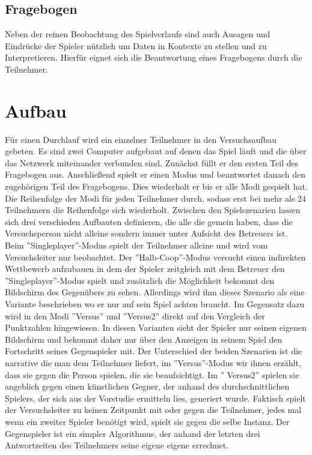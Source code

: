 \subsection{Fragebogen}
Neben der reinen Beobachtung des Spielverlaufs sind auch Ausagen und Eindrücke der Spieler nützlich um Daten in Kontexte zu stellen und zu Interpretieren. Hierfür eignet sich die Beantwortung eines Fragebogens durch die Teilnehmer.

\section{Aufbau}
Für einen Durchlauf wird ein einzelner Teilnehmer in den Versuchsaufbau gebeten. Es sind zwei Computer aufgebaut auf denen das Spiel läuft und die über das Netzwerk miteinander verbunden sind. Zunächst füllt er den ersten Teil des Fragebogen aus. Anschließend spielt er einen Modus und beantwortet danach den zugehörigen Teil des Fragebogens. Dies wiederholt er bis er alle Modi gespielt hat. Die Reihenfolge der Modi für jeden Teilnehmer durch, sodass erst bei mehr als 24 Teilnehmern die Reihenfolge sich wiederholt. Zwischen den Spielszenarien lassen sich drei verschieden Aufbauten definieren, die alle die gemein haben, dass die Versuchsperson nicht alleine sondern immer unter Aufsicht des Betreuers ist. Beim ''Singleplayer''-Modus spielt der  Teilnehmer alleine und wird vom Versuchsleiter nur beobachtet. Der ''Halb-Coop''-Modus  versucht einen indirekten Wettbewerb aufzubauen in dem der Spieler zeitgleich mit dem Betreuer den ''Singleplayer''-Modus spielt und zusätzlich die Möglichkeit bekommt den Bildschirm des Gegenübers zu sehen. Allerdings wird ihm dieses Szenario als eine Variante beschrieben wo er nur auf sein Spiel achten braucht. Im Gegensatz dazu wird in den Modi ''Versus'' und ''Versus2'' direkt auf den Vergleich der Punktzahlen hingewiesen. In diesen Varianten sieht der Spieler nur seinen eigenen Bildschirm und bekommt daher nur über den Anzeigen in seinem Spiel den Fortschritt seines Gegenspieler mit. Der Unterschied der beiden Szenarien ist die narrative die man dem Teilnehmer liefert, im ''Versus''-Modus wir ihnen erzählt, dass sie gegen die Person spielen, die sie beaufsichtigt. Im '' Versus2'' spielen sie angeblich gegen einen künstlichen  Gegner, der anhand des durchschnittlichen Spielers, der sich aus der Vorstudie ermitteln lies, generiert wurde. Faktisch spielt der Versuchsleiter zu keinen Zeitpunkt mit oder gegen die Teilnehmer, jedes mal wenn ein zweiter Spieler benötigt wird, spielt sie gegen die selbe Instanz. Der Gegenspieler ist ein simpler Algorithmus, der anhand der letzten drei Antwortzeiten des Teilnehmers seine eigene eigene errechnet.

